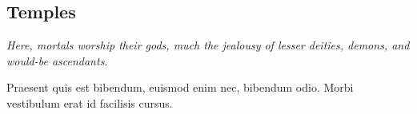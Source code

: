 \subsection{Temples}
\textit{Here, mortals worship their gods, much the jealousy of lesser deities, demons, and would-be ascendants.}

\begin{quotebox}
Praesent quis est bibendum, euismod enim nec, bibendum odio. Morbi vestibulum erat id facilisis cursus.
\end{quotebox}
